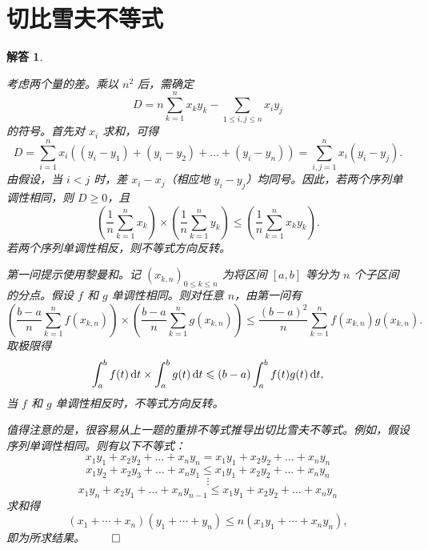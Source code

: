 \documentclass[12pt,UTF8]{ctexbook}
\theoremstyle{exercisestyle}
\theoremstyle{solutionstyle}
\newtheorem*{solution*}{解答}
\newenvironment{solution}
  {\begin{solution*}}
  {\hfill\ensuremath{\qed}\end{solution*}}
\begin{document}
\section{切比雪夫不等式}
\begin{solution}
  \begin{subquestions}
    \item 考虑两个量的差。乘以 \(n^2\) 后，需确定
    \[
    D = n \sum_{k=1}^{n} x_k y_k - \sum_{1 \leqslant i,j \leqslant n} x_i y_j
    \]
    的符号。首先对 \(x_i\) 求和，可得
    \[
    D = \sum_{i=1}^{n} x_i \left( (y_i - y_1) + (y_i - y_2) + \dots + (y_i - y_n) \right) = \sum_{i,j=1}^{n} x_i (y_i - y_j).
    \]
    由假设，当 \(i < j\) 时，差 \(x_i - x_j\)（相应地 \(y_i - y_j\)）均同号。因此，若两个序列单调性相同，则 \(D \geqslant 0\)，且
    \[
    \left(\frac{1}{n}\sum_{k=1}^n x_k\right) \times \left(\frac{1}{n}\sum_{k=1}^n y_k\right) \leqslant \left(\frac{1}{n}\sum_{k=1}^n x_k y_k\right).
    \]
    若两个序列单调性相反，则不等式方向反转。
    \item 第一问提示使用黎曼和。记 \((x_{k,n})_{0\leq k\leq n}\) 为将区间 \([a, b]\) 等分为 \(n\) 个子区间的分点。假设 \(f\) 和 \(g\) 单调性相同。则对任意 \(n\)，由第一问有
    \[
    \left(\frac{b-a}{n}\sum_{k=1}^n f(x_{k,n})\right) \times \left(\frac{b-a}{n}\sum_{k=1}^n g(x_{k,n})\right) \leqslant \frac{(b-a)^2}{n}\sum_{k=1}^n f(x_{k,n})g(x_{k,n}).
    \]
    取极限得
    \[
    \int_{a}^{b} f(t) \,\mathrm{d}t \times \int_{a}^{b} g(t) \,\mathrm{d}t \leqslant (b-a)\int_{a}^{b} f(t)g(t) \,\mathrm{d}t,
    \]
    当 \(f\) 和 \(g\) 单调性相反时，不等式方向反转。
  \end{subquestions}
  值得注意的是，很容易从上一题的重排不等式推导出切比雪夫不等式。例如，假设序列单调性相同。则有以下不等式：
  \[
  x_1y_1 + x_2y_2 + \dots + x_ny_n = x_1y_1 + x_2y_2 + \dots + x_ny_n
  \]
  \[
  x_1y_2 + x_2y_3 + \dots + x_ny_1 \leqslant x_1y_1 + x_2y_2 + \dots + x_ny_n
  \]
  \[
  \vdots
  \]
  \[
  x_1y_n + x_2y_1 + \dots + x_ny_{n-1} \leqslant x_1y_1 + x_2y_2 + \dots + x_ny_n
  \]
  求和得
  \[
  (x_1 + \cdots + x_n)(y_1 + \cdots + y_n) \leqslant n(x_1y_1 + \cdots + x_ny_n),
  \]
  即为所求结果。
\end{solution}
\end{document}
